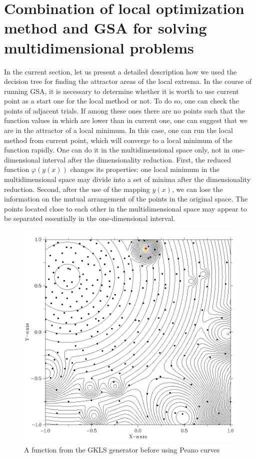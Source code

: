 \documentclass{svproc}
\begin{document}
\section{Combination of local optimization method and GSA for solving multidimensional  problems}\label{SecGSAL}

In the current section, let us present a detailed description how we used the decision tree for finding  the attractor areas of the local extrema.  In the course of running GSA, it is necessary to determine whether it is worth to use current point as a  start one for the local method or not. To do so, one can check the points of adjacent trials. If among  these ones there are no points such that the function values in which are lower than in current one, one  can suggest that we are in the attractor of a local minimum. In this case, one can run the local method  from current point, which will converge to a local minimum of the function rapidly.  One can do it in the multidimensional space only, not in one-dimensional interval after the  dimensionality reduction.  First, the reduced function $\varphi(y(x))$ changes its properties: one local minimum in the  multidimensional space may divide into a set of minima after the dimensionality reduction.  Second, after the use of the mapping $y(x)$, we can lose the information on the mutual arrangement of  the points in the original space. The points located close to each other in the multidimensional space  may appear to be separated essentially in the one-dimensional interval.

\begin{figure}[ht!] 
	\begin{center} 
		\begin{minipage}[h]{0.6\linewidth} 
			\includegraphics[width=1\linewidth]{figure/fig2.png} 
			\caption{A function from the GKLS generator before using Peano curves} %
			\label{fig:fig2} 
		\end{minipage} 
	\end{center} 
\end{figure}	
\end{document}
